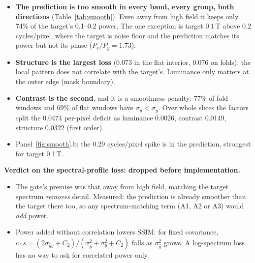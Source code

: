 \documentclass[10pt,a4paper]{article}
\begin{document}
\begin{itemize}
  \item \textbf{The prediction is too smooth in every band, every group, both directions}
        (Table~\ref{tab:smooth}). Even away from high field it keeps only 74\% of the target's
        0.1--0.2 power. The one exception is target 0.1\,T above 0.2 cycles/pixel, where the
        target is noise floor and the prediction matches its power but not its phase
        ($P_e/P_y = 1.73$).
  \item \textbf{Structure is the largest loss} (0.073 in the flat interior, 0.076 on folds):
        the local pattern does not correlate with the target's. Luminance only matters at the
        outer edge (mask boundary).
  \item \textbf{Contrast is the second}, and it is a smoothness penalty: 77\% of fold windows
        and 69\% of flat windows have $\sigma_{\hat y} < \sigma_y$. Over whole slices the
        factors split the 0.0474 per-pixel deficit as luminance 0.0026, contrast 0.0149,
        structure 0.0322 (first order).
  \item Panel~\ref{fig:smooth}.b: the 0.29 cycles/pixel spike is in the prediction, strongest
        for target 0.1\,T.
\end{itemize}

\textbf{Verdict on the spectral-profile loss: dropped before implementation.}
\begin{itemize}
  \item The gate's premise was that away from high field, matching the target spectrum
        \emph{removes} detail. Measured: the prediction is already smoother than the target there
        too, so any spectrum-matching term (A1, A2 or A3) would \emph{add} power.
  \item Power added without correlation lowers SSIM: for fixed covariance, $c\cdot s =
        (2\sigma_{\hat y y} + C_2)/(\sigma^2_{\hat y} + \sigma^2_y + C_2)$ falls as
        $\sigma^2_{\hat y}$ grows. A log-spectrum loss has no way to ask for correlated power only.
\end{itemize}
\end{document}
